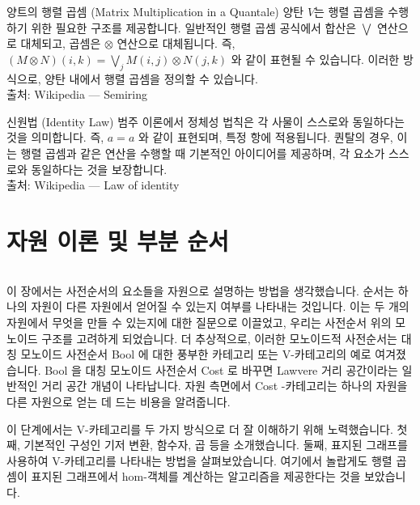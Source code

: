 \documentclass[11pt, a4paper, twoside, openany]{book}
\begin{document}
{\begin{deepresearch}{양트의 행렬 곱셈 (Matrix Multiplication in a Quantale)}
양탄 $V$는 행렬 곱셈을 수행하기 위한 필요한 구조를 제공합니다. 일반적인 행렬 곱셈 공식에서 합산은 $\bigvee$ 연산으로 대체되고, 곱셈은 $\otimes$ 연산으로 대체됩니다.  즉, $(M \otimes N)(i, k) = \bigvee_j M(i, j) \otimes N(j, k)$ 와 같이 표현될 수 있습니다. 이러한 방식으로, 양탄 내에서 행렬 곱셈을 정의할 수 있습니다.
\\[4pt]{\footnotesize\color{ctgray} 출처: Wikipedia — Semiring}
\end{deepresearch}

\begin{deepresearch}{신원법 (Identity Law)}
범주 이론에서 정체성 법칙은 각 사물이 스스로와 동일하다는 것을 의미합니다.  즉, $a = a$ 와 같이 표현되며, 특정 항에 적용됩니다. 퀀탈의 경우, 이는 행렬 곱셈과 같은 연산을 수행할 때 기본적인 아이디어를 제공하며, 각 요소가 스스로와 동일하다는 것을 보장합니다.
\\[4pt]{\footnotesize\color{ctgray} 출처: Wikipedia — Law of identity}
\end{deepresearch}


\section{자원 이론 및 부분 순서}
\label{sec:2-6}

$$ \text{ } $$

\par\medskip
이 장에서는 사전순서의 요소들을 자원으로 설명하는 방법을 생각했습니다. 순서는 하나의 자원이 다른 자원에서 얻어질 수 있는지 여부를 나타내는 것입니다. 이는 두 개의 자원에서 무엇을 만들 수 있는지에 대한 질문으로 이끌었고, 우리는 사전순서 위의 모노이드 구조를 고려하게 되었습니다. 더 추상적으로, 이러한 모노이드적 사전순서는 대칭 모노이드 사전순서 Bool 에 대한 풍부한 카테고리 또는 V-카테고리의 예로 여겨졌습니다. Bool 을 대칭 모노이드 사전순서 Cost 로 바꾸면 Lawvere 거리 공간이라는 일반적인 거리 공간 개념이 나타납니다. 자원 측면에서 Cost -카테고리는 하나의 자원을 다른 자원으로 얻는 데 드는 비용을 알려줍니다.

\par\medskip
이 단계에서는 V-카테고리를 두 가지 방식으로 더 잘 이해하기 위해 노력했습니다. 첫째, 기본적인 구성인 기저 변환, 함수자, 곱 등을 소개했습니다. 둘째, 표지된 그래프를 사용하여 V-카테고리를 나타내는 방법을 살펴보았습니다. 여기에서 놀랍게도 행렬 곱셈이 표지된 그래프에서 hom-객체를 계산하는 알고리즘을 제공한다는 것을 보았습니다.

}
\end{document}
